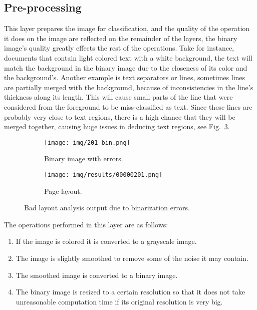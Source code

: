 \documentclass[conference]{IEEEtran}
\begin{document}
    \subsection{Pre-processing}

    This layer prepares the image for classification, and the quality of the operation it does on the image are reflected
    on the remainder of the layers, the binary image's quality greatly effects the rest of the operations.
    Take for instance, documents that contain light colored text with a white background, the text will
    match the background in the binary image due to the closeness of its color and the background's.
    Another example is text separators or lines, sometimes lines are partially merged with the background,
    because of inconsistencies in the line's thickness along its length.
    This will cause small parts of the line that were considered from the foreground to be miss-classified as text.
    Since these lines are probably very close to text regions, there is a high chance that they will be merged
    together, causing huge issues in deducing text regions, see Fig.~\ref{fig:bad-bin}.

    \begin{figure}[htbp]
        \centering
        \begin{subfigure}[b]{0.49\linewidth}
            \centering
            \texttt{[image: img/201-bin.png]}
            \caption{Binary image with errors.}
            \label{img:bin-bad}
        \end{subfigure}
        \hfill
        \begin{subfigure}[b]{0.49\linewidth}
            \centering
            \texttt{[image: img/results/00000201.png]}
            \caption{Page layout.}
            \label{img:pl}
        \end{subfigure}
        \caption{Bad layout analysis output due to binarization errors.}
        \label{fig:bad-bin}
    \end{figure}

    The operations performed in this layer are as follows:
    \begin{enumerate}
        \item If the image is colored it is converted to a grayscale image.
        \item The image is slightly smoothed to remove some of the noise it may contain.
        \item The smoothed image is converted to a binary image.
        \item The binary image is resized to a certain resolution so that it does not take
        unreasonable computation time if its original resolution is very big.
    \end{enumerate}
\end{document}
